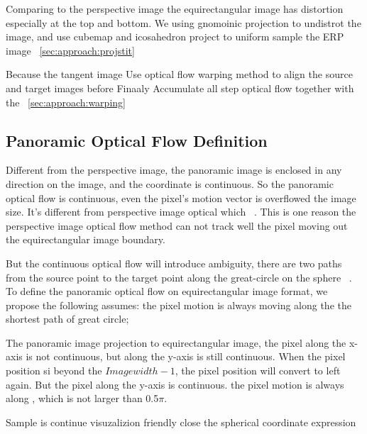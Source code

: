 Comparing to the perspective image the equirectangular image has distortion especially at the top and bottom. We using gnomoinic projection to undistrot the image, and  use cubemap and icosahedron project to uniform sample the ERP image ~\cref{sec:approach:projstit}

Because the tangent image 
Use optical flow warping method to align the source and target images before
Finaaly Accumulate all step optical flow together with the ~\cref{sec:approach:warping}


\subsection{Panoramic Optical Flow Definition}\label{sec:approach:definition}

Different from the perspective image, the panoramic image is enclosed in any direction on the image,  and the coordinate is continuous.
So the panoramic optical flow is continuous, even the pixel's motion vector is overflowed the image size.
It's different from perspective image optical which ~\cite{??}. 
This is one reason the perspective image optical flow method can not track well the pixel moving out the equirectangular image boundary.

But the continuous optical flow will introduce ambiguity, 
there are two paths from the source point to the target point along the great-circle on the sphere ~\cite{??}.
To define the panoramic optical flow on equirectangular image format, we propose the following assumes:
the pixel motion is always moving along the the shortest path of great circle;

The panoramic image projection to equirectangular image, the pixel along the x-axis is not continuous, but along the y-axis is still continuous. When the pixel position si beyond the  ${Imagewidth -1}$, the pixel position will convert to left again.
But the pixel along the y-axis is continuous.
the pixel motion is always along , which is not larger than 0.5$\pi$.

Sample is continue 
visuzalizion friendly
close the spherical coordinate expression

